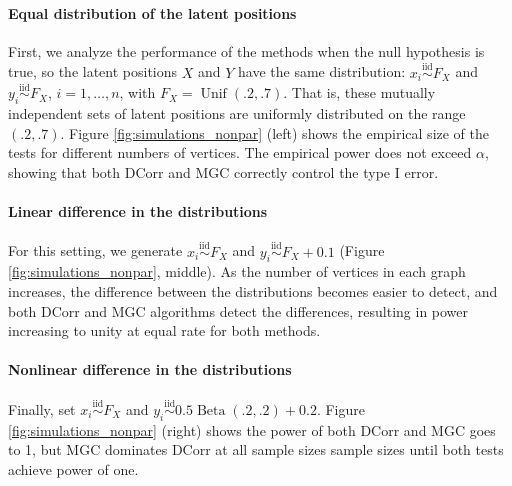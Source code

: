 \paragraph{Equal distribution of the latent positions}
First, we analyze the performance of the methods when the null hypothesis is true, so the latent positions $X$ and $Y$ have the same distribution: $x_i \overset{\text{iid}}{\sim} F_X$ and $y_i \overset{\text{iid}}{\sim} F_X$, $i=1,\ldots,n$,
with
$F_X = \operatorname{Unif}(.2,.7)$.
That is, these mutually independent sets of latent positions are uniformly distributed on the range $(.2, .7)$.
Figure \ref{fig:simulations_nonpar} (left) shows the empirical size of the tests for different numbers of vertices. The empirical power does not exceed $\alpha$, showing that both DCorr and MGC correctly control the type I error.
 
\paragraph{Linear difference in the distributions}
For this setting, we generate $x_i \overset{\text{iid}}{\sim} F_X$ and $y_i \overset{\text{iid}}{\sim} F_X + 0.1$ (Figure \ref{fig:simulations_nonpar}, middle).
As the number of vertices in each graph increases, the difference between the distributions becomes easier to detect, and both DCorr and MGC algorithms detect the differences, resulting in power increasing to unity at equal rate for both methods.

\paragraph{Nonlinear difference in the distributions}
Finally, set $x_i \overset{\text{iid}}{\sim} F_X$ and $y_i \overset{\text{iid}}{\sim} 0.5\operatorname{Beta}(.2, .2)+0.2$. Figure \ref{fig:simulations_nonpar} (right) shows  the power of both DCorr and MGC goes to 1, but MGC dominates DCorr at  all sample sizes sample sizes until both tests achieve power of one.


